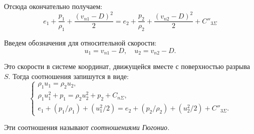 Отсюда окончательно получаем:
\begin{equation*}
	e_1 + \frac{p_1}{\rho_1} + \frac{(v_{n1} - D)^2}{2} = e_2 + \frac{p_2}{\rho_2} + \frac{(v_{n2} - D)^2}{2} + C''_{3\Sigma}
\end{equation*}

Введем обозначения для относительной скорости:
\begin{equation*}
	u_1 = v_{n1} - D, \quad u_2 = v_{n2} - D.
\end{equation*}

Это скорости в системе координат, движущейся вместе с поверхностью разрыва $S$. Тогда соотношения запишутся в виде:
\begin{equation*}
	\begin{cases}
		\rho_1 u_1 = \rho_2 u_2, \\
		\rho_1 u^2_1 + p_1 = \rho_2 u^2_2 + p_2 + C_{n\Sigma}, \\
		e_1 + (p_1 / \rho_1) + (u_1^2 / 2) = e_2 + (p_2 / \rho_2) + (u^2_2 / 2) + C''_{3\Sigma}.
	\end{cases}
\end{equation*}

Эти соотношения называют \textit{соотношениями Гюгонио.}